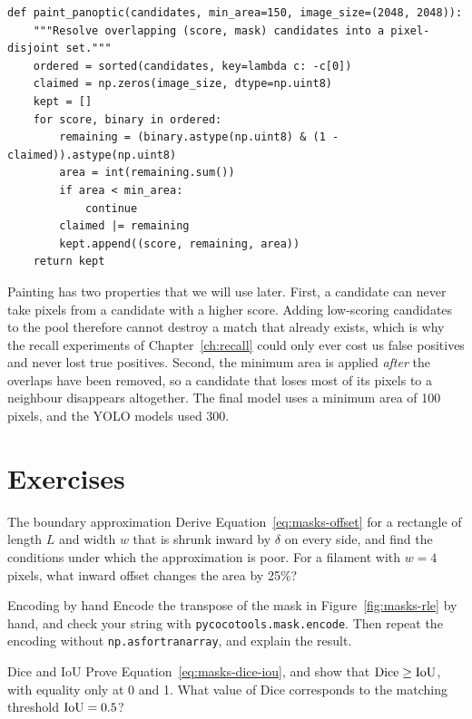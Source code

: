 \begin{lstlisting}[caption={Overlap resolution by painting. From \file{shared/utils.py:paint\_panoptic}.},label=lst:masks-paint]
def paint_panoptic(candidates, min_area=150, image_size=(2048, 2048)):
    """Resolve overlapping (score, mask) candidates into a pixel-disjoint set."""
    ordered = sorted(candidates, key=lambda c: -c[0])
    claimed = np.zeros(image_size, dtype=np.uint8)
    kept = []
    for score, binary in ordered:
        remaining = (binary.astype(np.uint8) & (1 - claimed)).astype(np.uint8)
        area = int(remaining.sum())
        if area < min_area:
            continue
        claimed |= remaining
        kept.append((score, remaining, area))
    return kept
\end{lstlisting}

Painting has two properties that we will use later. First, a candidate can never take pixels from
a candidate with a higher score. Adding low-scoring candidates to the pool therefore cannot destroy
a match that already exists, which is why the recall experiments of Chapter~\ref{ch:recall} could
only ever cost us false positives and never lost true positives. Second, the minimum area is
applied \emph{after} the overlaps have been removed, so a candidate that loses most of its pixels
to a neighbour disappears altogether. The final model uses a minimum area of 100 pixels, and the
YOLO models used 300.

\section*{Exercises}
\begin{exercise}{The boundary approximation}
Derive Equation~\eqref{eq:masks-offset} for a rectangle of length $L$ and width $w$ that is shrunk
inward by $\delta$ on every side, and find the conditions under which the approximation is poor.
For a filament with $w=4$ pixels, what inward offset changes the area by 25\%?
\end{exercise}

\begin{exercise}{Encoding by hand}
Encode the transpose of the mask in Figure~\ref{fig:masks-rle} by hand, and check your string with
\texttt{pycocotools.mask.encode}. Then repeat the encoding without \texttt{np.asfortranarray}, and
explain the result.
\end{exercise}

\begin{exercise}{Dice and IoU}
Prove Equation~\eqref{eq:masks-dice-iou}, and show that $\mathrm{Dice}\ge\mathrm{IoU}$, with equality only
at 0 and 1. What value of Dice corresponds to the matching threshold $\mathrm{IoU}=0.5$?
\end{exercise}

